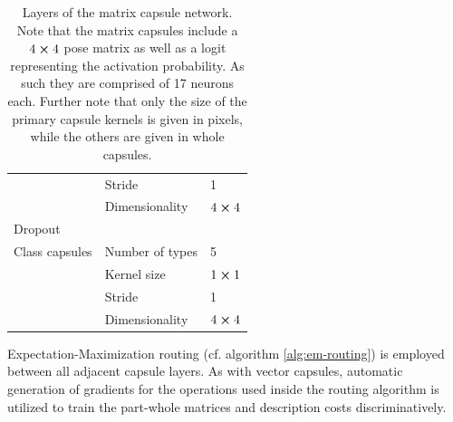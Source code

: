 \begin{table}[H]
\begin{tabular}{@{}lll@{}}
                         & Stride                  & 1                         \\
                         & Dimensionality          & $4\cross 4$               \\
Dropout                  &                         &                           \\
Class capsules           & Number of types         & 5                         \\
                         & Kernel size             & $1\cross 1$               \\
                         & Stride                  & 1                         \\
                         & Dimensionality          & $4\cross 4$               \\ \bottomrule
\end{tabular}
\caption[Layers of the matrix capsule network]{Layers of the matrix capsule network. Note that the matrix capsules include a $4\cross 4$ pose matrix as well as a logit representing the activation probability. As such they are comprised of 17 neurons each. Further note that only the size of the primary capsule kernels is given in pixels, while the others are given in whole capsules.}
\label{tab:matrix-config}
\end{table}\noindent
Expectation-Maximization routing (cf. algorithm \ref{alg:em-routing}) is employed between all adjacent capsule layers. As with vector capsules, automatic generation of gradients for the operations used inside the routing algorithm is utilized to train the part-whole matrices and description costs discriminatively.
